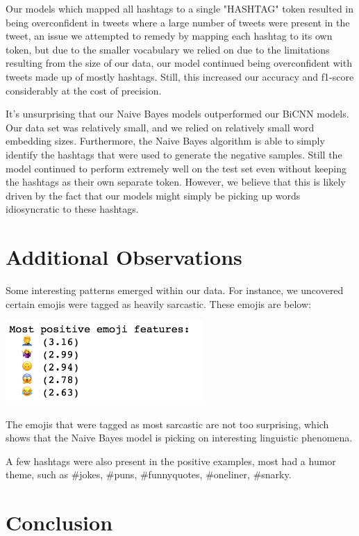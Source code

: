 \documentclass[11pt,a4paper]{article}
\begin{document}
Our models which mapped all hashtags to a single "HASHTAG" token resulted in being overconfident in tweets where a large number of tweets were present in the tweet, an issue we attempted to remedy by mapping each hashtag to its own token, but due to the smaller vocabulary we relied on due to the limitations resulting from the size of our data, our model continued being overconfident with tweets made up of mostly hashtags. Still, this increased our accuracy and f1-score considerably at the cost of precision.

It's unsurprising that our Naive Bayes models outperformed our BiCNN models. Our data set was relatively small, and we relied on relatively small word embedding sizes. Furthermore, the Naive Bayes algorithm is able to simply identify the hashtags that were used to generate the negative samples. Still the model continued to perform extremely well on the test set even without keeping the hashtags as their own separate token. However, we believe that this is likely driven by the fact that our models might simply be picking up words idiosyncratic to these hashtags.

\section{Additional Observations}

Some interesting patterns emerged within our data. For instance, we uncovered certain emojis were tagged as heavily sarcastic. These emojis are below:

\includegraphics[width=75mm,scale=0.5]{top_emoji.png}

The emojis that were tagged as most sarcastic are not too surprising, which shows that the Naive Bayes model is picking on interesting linguistic phenomena.

A few hashtags were also present in the positive examples, most had a humor theme, such as \#jokes, \#puns, \#funnyquotes, \#oneliner, \#snarky. 

\section{Conclusion}
\end{document}
